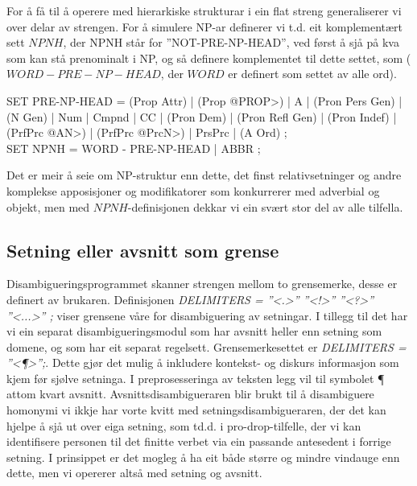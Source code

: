 \documentclass[a4paper,norsk]{article}
\begin{document}
For å få til å operere med hierarkiske strukturar i ein flat streng generaliserer vi over delar av strengen. For å simulere NP-ar definerer vi t.d. eit komplementært sett $NPNH$, der NPNH står for ''NOT-PRE-NP-HEAD'', ved først å sjå på kva som kan stå prenominalt i NP, og så definere komplementet til dette settet, som ($WORD - PRE-NP-HEAD$, der $WORD$ er definert som settet av alle ord). %

\begin{example}
SET PRE-NP-HEAD = (Prop Attr) | (Prop @PROP>) | A | (Pron Pers Gen) | (N Gen) | 
                  Num | Cmpnd | CC | (Pron Dem)  | (Pron Refl Gen) | 
                  (Pron Indef) | (PrfPrc @AN>) |  (PrfPrc @PrcN>) | PrsPrc | (A Ord) ; \\
SET NPNH        = WORD - PRE-NP-HEAD | ABBR ; \\                 
\end{example}

Det er meir å seie om NP-struktur enn dette, det finst relativsetninger og andre komplekse apposisjoner og modifikatorer som konkurrerer med adverbial og objekt, men med $NPNH$-definisjonen dekkar vi ein svært stor del av alle tilfella. %

\subsection{Setning eller avsnitt som grense}

Disambigueringsprogrammet skanner strengen mellom to grensemerke, desse er definert av brukaren. Definisjonen \emph{DELIMITERS = ''<.>'' ''<!>'' ''<?>'' ''<...>'' ;} viser grensene våre for disambiguering av setningar. I tillegg til det har vi ein separat disambigueringsmodul som har avsnitt heller enn setning som domene, og som har eit separat regelsett. Grensemerkesettet er \emph{DELIMITERS = ''<¶>'';}. Dette gjør det mulig å inkludere kontekst- og diskurs informasjon som kjem før sjølve setninga. I preprosesseringa av teksten legg vil til symbolet ¶ attom kvart avsnitt. Avsnittsdisambigueraren blir brukt til å disambiguere homonymi vi ikkje har vorte kvitt med setningsdisambigueraren, der det kan hjelpe å sjå ut over eiga setning, som td.d. i pro-drop-tilfelle, der vi kan identifisere personen til det finitte verbet via ein passande antesedent i forrige setning. %
I prinsippet er det mogleg å ha eit både større og mindre vindauge enn dette, men vi opererer altså med setning og avsnitt. %
\end{document}
